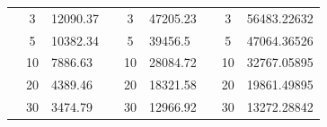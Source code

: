 \begin{table}[h]
\begin{tabular}{|cclcclccl|}
\rowcolor[HTML]{DAE8FC} 
\multicolumn{1}{|c|}{\cellcolor[HTML]{FFFFC7}}                                & \multicolumn{1}{c|}{\cellcolor[HTML]{DAE8FC}3}         & \multicolumn{1}{l|}{\cellcolor[HTML]{DAE8FC}12090.37}   & \multicolumn{1}{c|}{\cellcolor[HTML]{FFFFC7}}                                & \multicolumn{1}{c|}{\cellcolor[HTML]{DAE8FC}3}         & \multicolumn{1}{l|}{\cellcolor[HTML]{DAE8FC}47205.23}   & \multicolumn{1}{c|}{\cellcolor[HTML]{FFFFC7}}                                & \multicolumn{1}{c|}{\cellcolor[HTML]{DAE8FC}3}         & 56483.22632 \\ \cline{2-3} \cline{5-6} \cline{8-9} 
\rowcolor[HTML]{DDFDFF} 
\multicolumn{1}{|c|}{\cellcolor[HTML]{FFFFC7}}                                & \multicolumn{1}{c|}{\cellcolor[HTML]{DDFDFF}5}         & \multicolumn{1}{l|}{\cellcolor[HTML]{DDFDFF}10382.34}   & \multicolumn{1}{c|}{\cellcolor[HTML]{FFFFC7}}                                & \multicolumn{1}{c|}{\cellcolor[HTML]{DDFDFF}5}         & \multicolumn{1}{l|}{\cellcolor[HTML]{DDFDFF}39456.5}    & \multicolumn{1}{c|}{\cellcolor[HTML]{FFFFC7}}                                & \multicolumn{1}{c|}{\cellcolor[HTML]{DDFDFF}5}         & 47064.36526 \\ \cline{2-3} \cline{5-6} \cline{8-9} 
\rowcolor[HTML]{DAE8FC} 
\multicolumn{1}{|c|}{\cellcolor[HTML]{FFFFC7}}                                & \multicolumn{1}{c|}{\cellcolor[HTML]{DAE8FC}10}        & \multicolumn{1}{l|}{\cellcolor[HTML]{DAE8FC}7886.63}    & \multicolumn{1}{c|}{\cellcolor[HTML]{FFFFC7}}                                & \multicolumn{1}{c|}{\cellcolor[HTML]{DAE8FC}10}        & \multicolumn{1}{l|}{\cellcolor[HTML]{DAE8FC}28084.72}   & \multicolumn{1}{c|}{\cellcolor[HTML]{FFFFC7}}                                & \multicolumn{1}{c|}{\cellcolor[HTML]{DAE8FC}10}        & 32767.05895 \\ \cline{2-3} \cline{5-6} \cline{8-9} 
\rowcolor[HTML]{DDFDFF} 
\multicolumn{1}{|c|}{\cellcolor[HTML]{FFFFC7}}                                & \multicolumn{1}{c|}{\cellcolor[HTML]{DDFDFF}20}        & \multicolumn{1}{l|}{\cellcolor[HTML]{DDFDFF}4389.46}    & \multicolumn{1}{c|}{\cellcolor[HTML]{FFFFC7}}                                & \multicolumn{1}{c|}{\cellcolor[HTML]{DDFDFF}20}        & \multicolumn{1}{l|}{\cellcolor[HTML]{DDFDFF}18321.58}   & \multicolumn{1}{c|}{\cellcolor[HTML]{FFFFC7}}                                & \multicolumn{1}{c|}{\cellcolor[HTML]{DDFDFF}20}        & 19861.49895 \\ \cline{2-3} \cline{5-6} \cline{8-9} 
\rowcolor[HTML]{DAE8FC} 
\multicolumn{1}{|c|}{\cellcolor[HTML]{FFFFC7}}                                & \multicolumn{1}{c|}{\cellcolor[HTML]{DAE8FC}30}        & \multicolumn{1}{l|}{\cellcolor[HTML]{DAE8FC}3474.79}    & \multicolumn{1}{c|}{\cellcolor[HTML]{FFFFC7}}                                & \multicolumn{1}{c|}{\cellcolor[HTML]{DAE8FC}30}        & \multicolumn{1}{l|}{\cellcolor[HTML]{DAE8FC}12966.92}   & \multicolumn{1}{c|}{\cellcolor[HTML]{FFFFC7}}                                & \multicolumn{1}{c|}{\cellcolor[HTML]{DAE8FC}30}        & 13272.28842 \\ \cline{2-3} \cline{5-6} \cline{8-9} 

\end{tabular}
\end{table}
